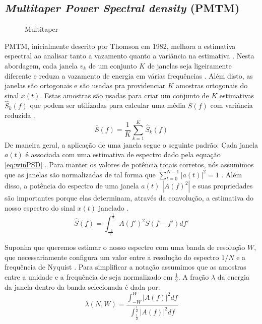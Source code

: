 \subsection{\textit{Multitaper Power Spectral density} (PMTM)}
\begin{figure}[!htp]
	\begin{center}
		\caption{Multitaper}
		\scalebox{.70}{
		
		}

		\label{fig:multitaper}
	\end{center}	
\end{figure}
\par 
\ac{PMTM}, inicialmente descrito por Thomson em 1982, melhora a estimativa espectral ao analisar tanto a vazamento quanto a vari\^ancia na estimativa \cite{PMTM}.
Nesta abordagem, cada janela $v_k$ de um conjunto $K$ de janelas seja ligeiramente diferente e reduza a vazamento de energia em v\'arias frequ\^encias \cite{PMTM}. 
Al\'em disto, as janelas s\~ao ortogonais e s\~ao usadas pra providenciar $K$ amostras ortogonais do sinal $x(t)$.
Estas amostras s\~ao usadas para criar um conjunto de $K$ estimativas $\hat{S}_k (f) $ que podem ser utilizadas para calcular uma  m\'edia $\bar{S}(f)$ com vari\^ancia reduzida \cite{PMTM}.
\begin{equation}
\bar{S}(f) = \frac{1}{K} \sum_{k=1}^{K} \hat{S}_k (f)
\end{equation}
De maneira geral, a aplica\c{c}\~ao de uma janela segue o seguinte padr\~ao: 
Cada janela $a(t)$ \'e associada com uma estimativa de espectro dado pela equa\c{c}\~ao \ref{eq:winPSD} \cite{PMTM}.
Para manter os valores de pot\^encia totais corretos, n\'os assumimos que as janelas s\~ao normalizadas de tal forma que $\sum_{t=0}^{N-1} {\left|  a(t)\right|}^{2}=1 $ \cite{PMTM}. 
Al\'em disso, a pot\^encia do espectro de uma janela $a(t)$ $\left| {A(f)}^{2} \right| $ e suas propriedades s\~ao importantes porque elas determinam, atrav\'es da convolu\c{c}\~ao, a estimativa do nosso espectro do sinal $x(t)$ janelado \cite{PMTM}.
\begin{equation}
\hat{S}(f) = \int_{\frac{-1}{2}}^{\frac{1}{2}} {A(f')}^{2}S(f - f')df'
\end{equation}

\par
Suponha que queremos estimar o nosso espectro com uma banda de resolu\c{c}\~ao $W$, que necessariamente configura um valor entre a resolu\c{c}\~ao do espectro $1/N$ e a frequ\^encia de Nyquist \cite{PMTM}.
Para simplificar a nota\c{c}\~ao assumimos que as amostras entre a unidade e a frequ\^encia de seja normalizado em $\frac{1}{2}$. A fra\c{c}\~ao $\lambda$ da energia da janela dentro da banda selecionada \'e dada por\cite{PMTM}:
\begin{equation}\label{eq:Taper}
\lambda(N,W)=\frac{\int_{-W}^{W}{\left| A(f) \right|}^2 df}{\int_{\frac{1}{2}}^{\frac{1}{2}}{\left| A(f) \right|}^2 df}
\end{equation}

